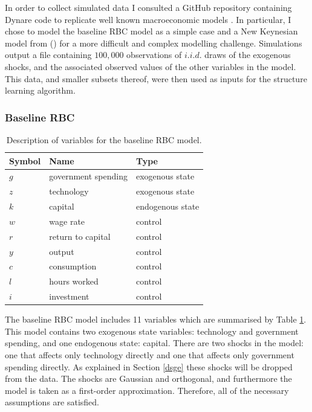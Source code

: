 \documentclass{article}
\begin{document}
In order to collect simulated data I consulted a GitHub repository containing Dynare code to replicate well known macroeconomic models \parencite{pfeifer2020}. In particular, I chose to model the baseline RBC model as a simple case and a New Keynesian model from \citeauthor{gali2015monetary} (\citeyear{gali2015monetary}) for a more difficult and complex modelling challenge. Simulations output a file containing $100,000$ observations of $i.i.d.$ draws of the exogenous shocks, and the associated observed values of the other variables in the model. This data, and smaller subsets thereof, were then used as inputs for the structure learning algorithm.

\subsubsection{Baseline RBC}

\begin{table}
  \centering
  \begin{tabular}{|l|l|l|}
    \hline
    Symbol & Name & Type \\
    \hline
    $g$ & government spending & exogenous state \\
    $z$ & technology & exogenous state \\
    $k$ & capital & endogenous state \\
    $w$ & wage rate & control \\
    $r$ & return to capital & control \\
    $y$ & output & control \\
    $c$ & consumption & control \\
    $l$ & hours worked & control \\
    $i$ & investment & control \\ \cline{2-2}
    \hline
  \end{tabular}
  \caption{Description of variables for the baseline RBC model.}
  \label{rbc_data}
\end{table}

The baseline RBC model includes 11 variables which are summarised by Table \ref{rbc_data}. This model contains two exogenous state variables: technology and government spending, and one endogenous state: capital. There are two shocks in the model: one that affects only technology directly and one that affects only government spending directly. As explained in Section \ref{dsge} these shocks will be dropped from the data. The shocks are Gaussian and orthogonal, and furthermore the model is taken as a first-order approximation. Therefore, all of the necessary assumptions are satisfied.
\end{document}
